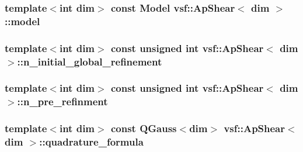 \hypertarget{classvsf_1_1ApShear_a3a6fb4045df9297aea20326cb0df5748}{
\subsubsection[{model}]{\setlength{\rightskip}{0pt plus 5cm}template$<$int dim$>$ const {\bf Model} {\bf vsf\-::\-Ap\-Shear}$<$ dim $>$\-::model\hspace{0.3cm}{\ttfamily [private]}}}\label{classvsf_1_1ApShear_a3a6fb4045df9297aea20326cb0df5748}
\hypertarget{classvsf_1_1ApShear_ab02322073eb961685e8daef27729bf8d}{
\subsubsection[{n\-\_\-initial\-\_\-global\-\_\-refinement}]{\setlength{\rightskip}{0pt plus 5cm}template$<$int dim$>$ const unsigned int {\bf vsf\-::\-Ap\-Shear}$<$ dim $>$\-::n\-\_\-initial\-\_\-global\-\_\-refinement\hspace{0.3cm}{\ttfamily [private]}}}\label{classvsf_1_1ApShear_ab02322073eb961685e8daef27729bf8d}
\hypertarget{classvsf_1_1ApShear_a5c702ecbc19d28d835e666c8ee87c4eb}{
\subsubsection[{n\-\_\-pre\-\_\-refinment}]{\setlength{\rightskip}{0pt plus 5cm}template$<$int dim$>$ const unsigned int {\bf vsf\-::\-Ap\-Shear}$<$ dim $>$\-::n\-\_\-pre\-\_\-refinment\hspace{0.3cm}{\ttfamily [private]}}}\label{classvsf_1_1ApShear_a5c702ecbc19d28d835e666c8ee87c4eb}
\hypertarget{classvsf_1_1ApShear_a2926794d4cbeed7550443a4999868110}{
\subsubsection[{quadrature\-\_\-formula}]{\setlength{\rightskip}{0pt plus 5cm}template$<$int dim$>$ const Q\-Gauss$<$dim$>$ {\bf vsf\-::\-Ap\-Shear}$<$ dim $>$\-::quadrature\-\_\-formula\hspace{0.3cm}{\ttfamily [private]}}}\label{classvsf_1_1ApShear_a2926794d4cbeed7550443a4999868110}
